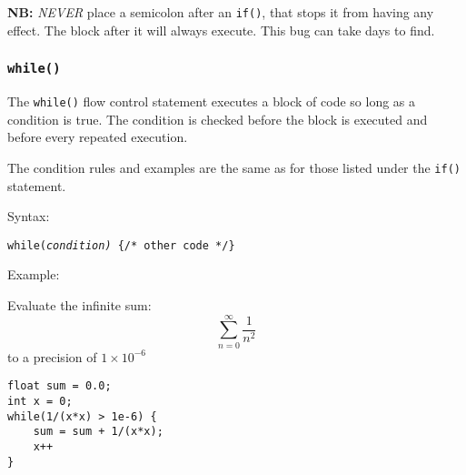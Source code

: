 \documentclass{lab}
\begin{document}
\begin{multicols}{2}
\textbf{NB:} \textit{NEVER} place a semicolon after an \texttt{if()}, that stops it from having any effect. The block after it will always execute. This bug can take days to find.

\subsubsection{\texttt{while()}}

The \texttt{while()} flow control statement executes a block of code so long as a condition is true. The condition is checked before the block is executed and before every repeated execution.

The condition rules and examples are the same as for those listed under the \texttt{if()} statement.

Syntax:

\texttt{while(\textit{condition)} \{/* other code */\}}

Example:

Evaluate the infinite sum:
\begin{equation}
\sum_{n=0}^{\infty} \frac{1}{n^2}
\end{equation}
to a precision of $1 \times 10^{-6}$
\begin{lstlisting}[style=CStyle]
float sum = 0.0;
int x = 0;
while(1/(x*x) > 1e-6) {
	sum = sum + 1/(x*x);
	x++
}
\end{lstlisting}


\begin{lstlisting}[style=CStyle]
\end{lstlisting}


\begin{lstlisting}[style=CStyle]
\end{lstlisting}

\end{multicols}
\end{document}
